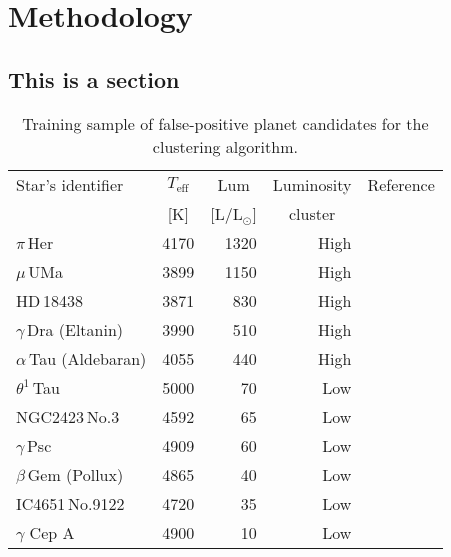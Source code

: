 %
\chapter{Methodology}
\label{sec:data}
\lipsum[1]

\section{This is a section}
\lipsum[2-4]

\begin{table}[tp!]
\caption{Training sample of false-positive planet candidates for the clustering algorithm.}
\tabcolsep=6.5pt %
\hfill\begin{tabular}{l r r r l} 
 \hline
 \hline
 Star's identifier& 
\multicolumn{1}{c}{$T_{\mathrm{eff}}$} & 
\multicolumn{1}{c}{Lum} & 
\multicolumn{1}{l}{Luminosity} & 
Reference \\

 & 
\multicolumn{1}{c}{[K]} & 
\multicolumn{1}{c}{[L/L$_\odot$]} &  
\multicolumn{1}{c}{cluster}&  \\[0.5ex] 
 \hline
 $\pi$\,Her & 4170 & 1320 & High & \cite{Hatzes1999} \\ 
 $\mu$\,UMa & 3899 & 1150 & High & \cite{Lee2016} \\
 HD\,18438 & 3871 & 830 & High & \cite{Delgado2018} \\
 $\gamma$\,Dra (Eltanin) & 3990 & 510 & High & \cite{Hatzes2018} \\
 $\alpha$\,Tau (Aldebaran) & 4055 & 440 & High & \cite{Hatzes2015} \\ 
 \hline
 $\theta^1$\,Tau & 5000 & 70 & Low & \cite{Beck2015} \\
 NGC2423\,No.3 & 4592 & 65 & Low &\cite{Delgado2018} \\ 
 $\gamma$\,Psc & 4909 & 60 & Low & \cite{Beck2015} \\ 
 $\beta$\,Gem (Pollux) & 4865 & 40 & Low  & \cite{Delgado2018} \\
 IC4651\,No.9122 & 4720 & 35 & Low & \cite{Delgado2018} \\
 $\gamma$ Cep A & 4900 & 10 & Low & \cite{Hatzes1999} \\ 
 \hline
\end{tabular} \hfill~
\label{tab:false_positives}

\end{table}

